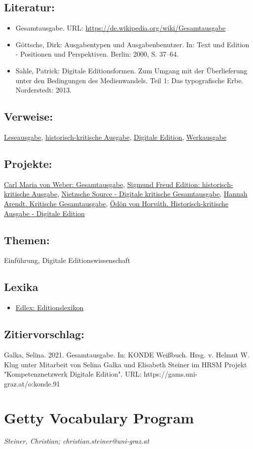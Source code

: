 \documentclass{article}
\begin{document}
        \subsection*{Literatur:}\begin{itemize}\item Gesamtausgabe. URL: \url{https://de.wikipedia.org/wiki/Gesamtausgabe}\item Göttsche, Dirk: Ausgabentypen und Ausgabenbenutzer. In: Text und Edition - Positionen und Perspektiven. Berlin: 2000, S. 37–64.\item Sahle, Patrick: Digitale Editionsformen. Zum Umgang mit der Überlieferung unter den Bedingungen des Medienwandels. Teil 1: Das typografische Erbe. Norderstedt: 2013.\end{itemize}\subsection*{Verweise:}\href{https://gams.uni-graz.at/o:konde.116}{Leseausgabe}, \href{https://gams.uni-graz.at/o:konde.93}{historisch-kritische Ausgabe}, \href{https://gams.uni-graz.at/o:konde.59}{Digitale Edition}, \href{https://gams.uni-graz.at/o:konde.213}{Werkausgabe}\subsection*{Projekte:}\href{https://weber-gesamtausgabe.de/de/Index}{Carl Maria von Weber: Gesamtausgabe}, \href{https://www.freud-edition.net}{Sigmund Freud Edition: historisch-kritische Ausgabe}, \href{http://www.nietzschesource.org/#eKGWB}{Nietzsche Source - Digitale kritische Gesamtausgabe}, \href{https://www.arendteditionprojekt.de}{Hannah Arendt. Kritische Gesamtausgabe}, \href{https://gams.uni-graz.at/context:ohad}{Ödön von Horváth. Historisch-kritische Ausgabe - Digitale Edition}\subsection*{Themen:}Einführung, Digitale Editionswissenschaft\subsection*{Lexika}\begin{itemize}\item \href{https://edlex.de/index.php?title=Gesamtausgabe}{Edlex: Editionslexikon}\end{itemize}\subsection*{Zitiervorschlag:}Galka, Selina. 2021. Gesamtausgabe. In: KONDE Weißbuch. Hrsg. v. Helmut W. Klug unter Mitarbeit von Selina Galka und Elisabeth Steiner im HRSM Projekt "Kompetenznetzwerk Digitale Edition". URL: https://gams.uni-graz.at/o:konde.91\newpage\section*{Getty Vocabulary Program} \emph{Steiner, Christian; christian.steiner@uni-graz.at}\\
        
\end{document}
